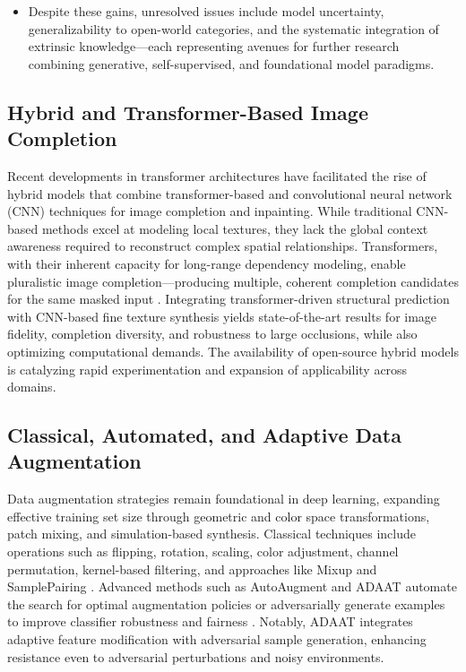 \documentclass[sigconf]{acmart}
\begin{document}
\begin{itemize}
    \item Despite these gains, unresolved issues include model uncertainty, generalizability to open-world categories, and the systematic integration of extrinsic knowledge—each representing avenues for further research combining generative, self-supervised, and foundational model paradigms.
\end{itemize}

\subsection{Hybrid and Transformer-Based Image Completion}

Recent developments in transformer architectures have facilitated the rise of hybrid models that combine transformer-based and convolutional neural network (CNN) techniques for image completion and inpainting. While traditional CNN-based methods excel at modeling local textures, they lack the global context awareness required to reconstruct complex spatial relationships. Transformers, with their inherent capacity for long-range dependency modeling, enable pluralistic image completion---producing multiple, coherent completion candidates for the same masked input \cite{ref92}. Integrating transformer-driven structural prediction with CNN-based fine texture synthesis yields state-of-the-art results for image fidelity, completion diversity, and robustness to large occlusions, while also optimizing computational demands. The availability of open-source hybrid models is catalyzing rapid experimentation and expansion of applicability across domains.

\subsection{Classical, Automated, and Adaptive Data Augmentation}

Data augmentation strategies remain foundational in deep learning, expanding effective training set size through geometric and color space transformations, patch mixing, and simulation-based synthesis. Classical techniques include operations such as flipping, rotation, scaling, color adjustment, channel permutation, kernel-based filtering, and approaches like Mixup and SamplePairing \cite{ref54,ref55,ref61,ref64}. Advanced methods such as AutoAugment and ADAAT automate the search for optimal augmentation policies or adversarially generate examples to improve classifier robustness and fairness \cite{ref66,ref85}. Notably, ADAAT integrates adaptive feature modification with adversarial sample generation, enhancing resistance even to adversarial perturbations and noisy environments.
\end{document}
